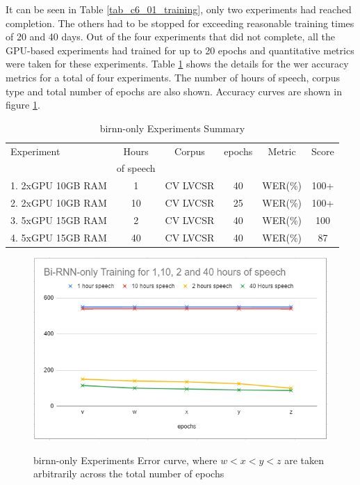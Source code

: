 It can be seen in Table \ref{tab_c6_01_training}, only two experiments had reached completion.    The others had to be stopped for exceeding reasonable training times of 20 and 40 days. Out of the four experiments that did not complete, all the GPU-based experiments had trained for up to 20 epochs and quantitative metrics were taken for these experiments.  Table \ref{tab_c6_02_training} shows the details for the \acrfull{wer} accuracy metrics for a total of four experiments. The number of hours of speech, corpus type and total number of epochs are also shown. Accuracy curves are shown in figure \ref{fig_6_3_wer}.

\begin{table}
  \caption{\acrshort{birnn}-only Experiments Summary}
  \label{tab_c6_02_training}
\begin{tabular}{lccccc}
\toprule
Experiment & Hours & Corpus & epochs & Metric & Score\\& of speech\\
\midrule
1. 2xGPU 10GB RAM & 1 & CV LVCSR & 40 & WER(\%) & 100+\\
2. 2xGPU 10GB RAM & 10 & CV LVCSR & 25 & WER(\%) & 100+\\
3. 5xGPU 15GB RAM & 2 & CV LVCSR & 40 & WER(\%) & 100\\
4. 5xGPU 15GB RAM & 40 &  CV LVCSR & 40 & WER(\%) & 87\\
\bottomrule
\end{tabular}
\end{table}


\begin{figure}
\centering
  \includegraphics[width=14cm]{thesis/images/brnn_only.png}\\
  \caption{\acrshort{birnn}-only Experiments Error curve, where $w<x<y<z$ are taken arbitrarily across the total
number of epochs} \label{fig_6_3_wer}
\end{figure}


